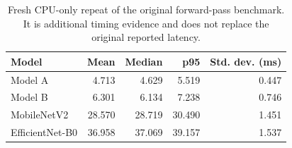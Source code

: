\begin{table}[t]
\centering\small
\caption{Fresh CPU-only repeat of the original forward-pass benchmark. It is additional timing evidence and does not replace the original reported latency.}
\label{tab:latency-repeat}
\begin{tabular}{lrrrr}\toprule
Model & Mean & Median & p95 & Std. dev. (ms)\\\midrule
Model A & 4.713 & 4.629 & 5.519 & 0.447\\
Model B & 6.301 & 6.134 & 7.238 & 0.746\\
MobileNetV2 & 28.570 & 28.719 & 30.490 & 1.451\\
EfficientNet-B0 & 36.958 & 37.069 & 39.157 & 1.537\\
\bottomrule\end{tabular}
\end{table}
